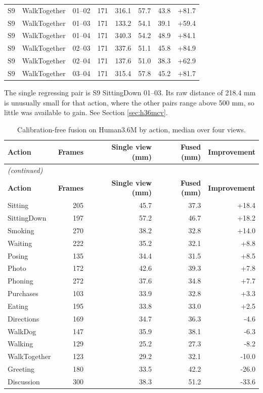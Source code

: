 \begin{center}
{\begin{longtable}{llrrrrrr}
S9 & WalkTogether & 01--02 & 171 & 316.1 & 57.7 & 43.8 & +81.7 \\
S9 & WalkTogether & 01--03 & 171 & 133.2 & 54.1 & 39.1 & +59.4 \\
S9 & WalkTogether & 01--04 & 171 & 340.3 & 54.2 & 48.9 & +84.1 \\
S9 & WalkTogether & 02--03 & 171 & 337.6 & 51.1 & 45.8 & +84.9 \\
S9 & WalkTogether & 02--04 & 171 & 137.6 & 51.0 & 38.3 & +62.9 \\
S9 & WalkTogether & 03--04 & 171 & 315.4 & 57.8 & 45.2 & +81.7 \\
\end{longtable}
}
\end{center}
\noindent The single regressing pair is S9 SittingDown 01--03. Its raw distance of 218.4 mm is unusually small for that action, where the other pairs range above 500 mm, so little was available to gain. See Section \ref{sec:h36mcv}.

\vspace{0.6cm}

\begin{center}
{\fontsize{10}{12}\selectfont
\begin{longtable}{lrrrr}
\caption{Calibration-free fusion on Human3.6M by action, median over four views.}\label{tab:appfusion}\\
\hline
\textbf{Action} & \textbf{Frames} & \textbf{Single view (mm)} & \textbf{Fused (mm)} & \textbf{Improvement} \\
\hline
\endfirsthead
\multicolumn{5}{l}{\textit{(continued)}}\\
\hline
\textbf{Action} & \textbf{Frames} & \textbf{Single view (mm)} & \textbf{Fused (mm)} & \textbf{Improvement} \\
\hline
\endhead
\hline
\endfoot
Sitting & 205 & 45.7 & 37.3 & +18.4 \\
SittingDown & 197 & 57.2 & 46.7 & +18.2 \\
Smoking & 270 & 38.2 & 32.8 & +14.0 \\
Waiting & 222 & 35.2 & 32.1 & +8.8 \\
Posing & 135 & 34.4 & 31.5 & +8.5 \\
Photo & 172 & 42.6 & 39.3 & +7.8 \\
Phoning & 272 & 37.6 & 34.8 & +7.7 \\
Purchases & 103 & 33.9 & 32.8 & +3.3 \\
Eating & 195 & 33.8 & 33.0 & +2.5 \\
Directions & 169 & 34.7 & 36.3 & -4.6 \\
WalkDog & 147 & 35.9 & 38.1 & -6.3 \\
Walking & 129 & 25.2 & 27.3 & -8.2 \\
WalkTogether & 123 & 29.2 & 32.1 & -10.0 \\
Greeting & 180 & 33.5 & 42.2 & -26.0 \\
Discussion & 300 & 38.3 & 51.2 & -33.6 \\
\end{longtable}
}
\end{center}


